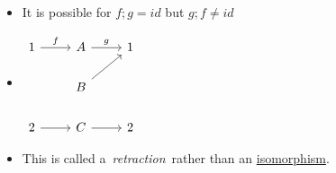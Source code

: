\begin{itemize}
    \item It is possible for $f;g=id$ but $g;f \ne id$
    \item $\begin{tikzcd}1 \arrow[r, "f"] & A \arrow[r, "g"] & 1 \\& B \arrow[ru]     &   \\2 \arrow[r]      & C \arrow[r]      & 2\end{tikzcd}$
    \item This is called a \,\emph{retraction}\, rather than an \hyperref[D3.28]{isomorphism}.
  \end{itemize}
